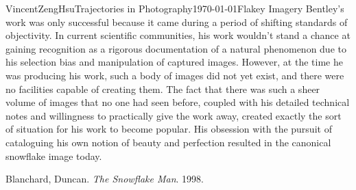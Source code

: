 \documentclass{article}[12pt]
\begin{document}
\begin{mla}{Vincent}{Zeng}{Hsu}{Trajectories in Photography}{\today}{Flakey Imagery}
Bentley's work was only successful because it came during a period of shifting standards of objectivity. In current scientific communities, his work wouldn't stand a chance at gaining recognition as a rigorous documentation of a natural phenomenon due to his selection bias and manipulation of captured images. However, at the time he was producing his work, such a body of images did not yet exist, and there were no facilities capable of creating them. The fact that there was such a sheer volume of images that no one had seen before, coupled with his detailed technical notes and willingness to practically give the work away, created exactly the sort of situation for his work to become popular. His obsession with the pursuit of cataloguing his own notion of beauty and perfection resulted in the canonical snowflake image today.

\begin{workscited}
	
	\bibindent 
	Blanchard, Duncan. \textit{The Snowflake Man}. 1998.
	
\end{workscited}
\end{mla}
\end{document}
